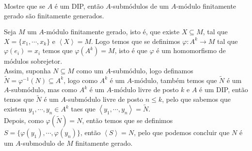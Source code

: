 \begin{homeworkProblem}[2]
  Mostre que se $A$ é um DIP, então $A$-submódulos de um $A$-módulo finitamente gerado são finitamente generados.
  \begin{solution}
    Seja $M$ um $A$-módulo finitamente gerado, isto é, que existe $X\subseteq M$, tal que $X=\{x_1,\cdots,x_k\}$ e $\left\langle X \right\rangle=M$. Logo temos que se definimos $\varphi:A^{k}\to M$ tal que $\varphi(e_i)=x_i$ temos que $\varphi(A^{k})=M$, isto é que $\varphi$ é um homomorfismo de módulos sobrejetor.\\
    Assim, suponha $N\subseteq M$ como um $A$-submódulo, logo definamos $\tilde{N}=\varphi^{-1}(N)\subseteq A^{k}$, logo como $A^{k}$ é um $A$-módulo, também temos que $\tilde{N}$ é um $A$-submódulo, mas como $A^{k}$ é um $A$-módulo livre de posto $k$ e $A$ é um DIP, então temos que $\tilde{N}$ é um $A$-submódulo livre de posto $n\leq k$, pelo que sabemos que existem $y_1,\cdots,y_n\in A^{k}$ taes que $\left\langle y_1,\cdots,y_n \right\rangle=\tilde{N}$.\\
    Depois, como $\varphi(\tilde{N})=N$, então temos que se definimos $S=\{\varphi(y_1),\cdots,\varphi(y_n)\}$, então $\left\langle S \right\rangle=N$, pelo que podemos concluir que $N$ é um $A$-submodulo de $M$ finitamente gerado. 
  \end{solution}
\end{homeworkProblem}
